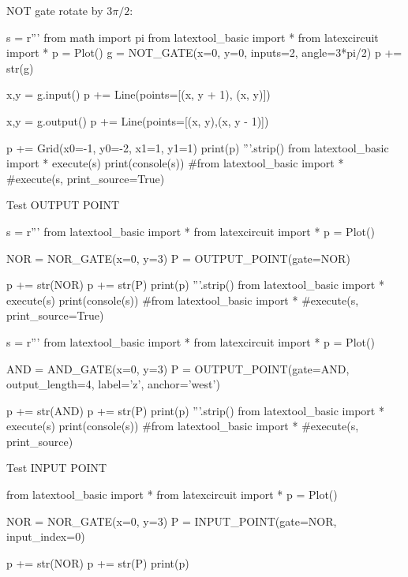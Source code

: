 NOT gate rotate by $3\pi/2$:
\begin{python}
s = r'''
from math import pi
from latextool_basic import *
from latexcircuit import *
p = Plot()
g = NOT_GATE(x=0, y=0, inputs=2, angle=3*pi/2)
p += str(g)

x,y = g.input()
p += Line(points=[(x, y + 1), (x, y)])

x,y = g.output()
p += Line(points=[(x, y),(x, y - 1)])

p += Grid(x0=-1, y0=-2, x1=1, y1=1)
print(p)
'''.strip()
from latextool_basic import *
execute(s)
print(console(s))
#from latextool_basic import *
#execute(s, print_source=True)
\end{python}



\newpage
Test OUTPUT POINT
\begin{python}
s = r'''
from latextool_basic import *
from latexcircuit import *
p = Plot()

NOR = NOR_GATE(x=0, y=3)
P = OUTPUT_POINT(gate=NOR)

p += str(NOR)
p += str(P)
print(p)
'''.strip()
from latextool_basic import *
execute(s)
print(console(s))
#from latextool_basic import *
#execute(s, print_source=True)
\end{python}

\begin{python}
s = r'''
from latextool_basic import *
from latexcircuit import *
p = Plot()

AND = AND_GATE(x=0, y=3)
P = OUTPUT_POINT(gate=AND, output_length=4, label='z', anchor='west')

p += str(AND)
p += str(P)
print(p)
'''.strip()
from latextool_basic import *
execute(s)
print(console(s))
#from latextool_basic import *
#execute(s, print_source)
\end{python}






\newpage
Test INPUT POINT
\begin{python}
from latextool_basic import *
from latexcircuit import *
p = Plot()

NOR = NOR_GATE(x=0, y=3)
P = INPUT_POINT(gate=NOR, input_index=0)

p += str(NOR)
p += str(P)
print(p)
\end{python}



